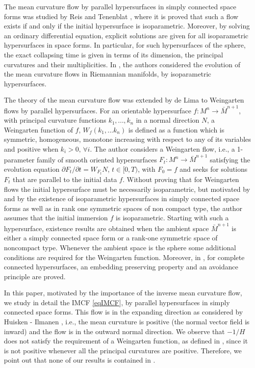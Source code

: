 \documentclass[11pt,a4paper,reqno]{amsproc}
\numberwithin{equation}{section}
\begin{document}
\newpage 

The mean curvature flow by parallel hypersurfaces in simply connected space forms was studied by Reis and Tenenblat \cite{ReisTenenblat}, where it is proved that such a flow exists if and only if  
the initial hypersurface is isoparametric. Moreover, by solving an ordinary differential equation, explicit solutions are given for all isoparametric hypersurfaces in space forms. In particular, for such hypersurfaces of the sphere, the exact  collapsing time is given in terms of its dimension, the principal curvatures and their multiplicities. In \cite{GuiSantosSantos}, the authors considered the evolution of the mean curvature flows in  Riemannian manifolds, by isoparametric hypersurfaces. 
    
 
 The theory  of the mean curvature flow was extended  by  de Lima \cite{deLima} to Weingarten flows by parallel hypersurfaces. For an orientable hypersurface  
$f:M^n\rightarrow \bar{M}^{n+1}$, with principal curvature functions $k_1,...,k_n$ in a normal direction $N$,   a Weingarten function of $f$, $W_f(k_1,...k_n)$ is defined as a function which is symmetric, homogeneous, monotone increasing with respect to any of its variables and positive when $k_i>0,\, \forall i$. The author considers a Weingarten flow, i.e.,  a 1-parameter family of smooth oriented hypersurfaces $F_t: M^n\rightarrow \bar{M}^{n+1}$ satisfying the evolution equation $\partial F_t/\partial t=W_{F_t} N$, $t\in [0,T)$, with $F_0=f$ and  seeks for solutions $F_t$ that are parallel to the initial data $f$. 
 Without proving that for Weingarten flows the initial hypersurface must be necessarily isoparametric, but  motivated by \cite{ReisTenenblat} and by the existence  of isoparametric hypersurfaces in simply connected space forms as well as in rank one symmetric spaces of non compact type, the  author assumes that the initial immersion $f$ is isoparametric. Starting with such a hypersurface, existence results are obtained when the ambient space $\bar{M}^{n+1}$ is either a simply connected space form or a rank-one 
 symmetric space of noncompact type. Whenever the ambient space is the sphere some additional  conditions are required for the Weingarten function. 
Moreover, in \cite{deLima},  for complete connected hypersurfaces,  an embedding preserving property and an avoidance principle are proved. 


In this paper, motivated by the importance of the inverse mean curvature flow, we study in detail the IMCF  \eqref{eqIMCF}, by parallel hypersurfaces in simply connected space forms. This flow is in the expanding direction as considered by Huisken - Ilmanen \cite{HuiskenIlmanen}, i.e., the mean curvature is positive (the normal vector field is inward) and the flow is in the outward normal direction. We observe that $-1/H$ does not satisfy the requirement of a  Weingarten function, as defined in \cite{deLima}, since it is not positive whenever  all the principal curvatures are positive. Therefore, we point out that  none of our results is contained in \cite{deLima}.  
\end{document}
